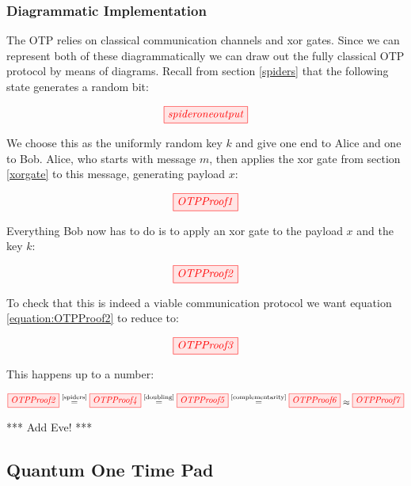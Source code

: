 \documentclass[]{article}
\newcommand{\equaltext}[1]{\ensuremath{\stackrel{\text{#1}}{=}}}
\begin{document}
\subsubsection{Diagrammatic Implementation}

The OTP relies on classical communication channels and xor gates. Since we can represent both of these diagrammatically we can draw out the fully classical OTP protocol by means of diagrams. Recall from section \ref{spiders} that the following state generates a random bit:

\begin{equation}
	\tikzfig{spideroneoutput}
\end{equation}

We choose this as the uniformly random key $k$ and give one end to Alice and one to Bob. Alice, who starts with message $m$, then applies the xor gate from section \ref{xorgate} to this message, generating payload $x$:

\begin{equation}
	\tikzfig{OTPProof1}
\end{equation}

Everything Bob now has to do is to apply an xor gate to the payload $x$ and the key $k$:

\begin{equation}
\label{equation:OTPProof2}
\tikzfig{OTPProof2}
\end{equation}

To check that this is indeed a viable communication protocol we want equation \ref{equation:OTPProof2} to reduce to:

\begin{equation}
\label{equation:OTPProof3}
\tikzfig{OTPProof3}
\end{equation}

This happens up to a number:

\begin{equation}
\label{equation:OTPProoflong}
\tikzfig{OTPProof2}\equaltext{\ref{spiders}} \tikzfig{OTPProof4} \equaltext{\ref{doubling}} \tikzfig{OTPProof5} \equaltext{\ref{complementarity}} \tikzfig{OTPProof6} \approx \tikzfig{OTPProof7}
\end{equation}

*** Add Eve! ***

\subsection{Quantum One Time Pad}
\end{document}
